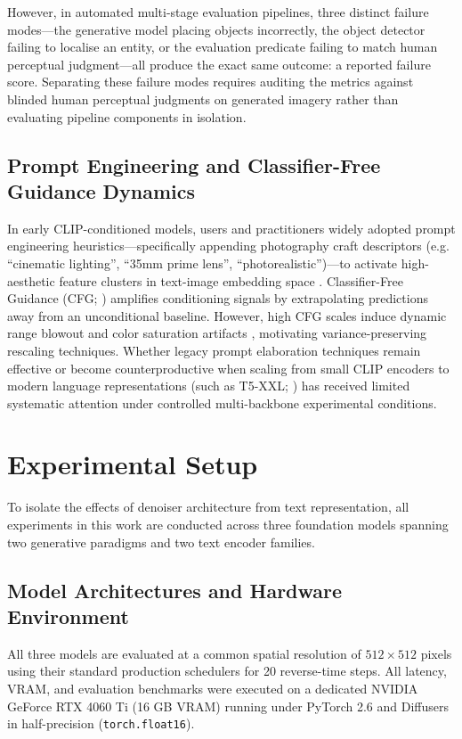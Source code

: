 \documentclass[10pt,twocolumn,letterpaper]{article}
\begin{document}
However, in automated multi-stage evaluation pipelines, three distinct failure modes---the generative model placing objects incorrectly, the object detector failing to localise an entity, or the evaluation predicate failing to match human perceptual judgment---all produce the exact same outcome: a reported failure score. Separating these failure modes requires auditing the metrics against blinded human perceptual judgments on generated imagery rather than evaluating pipeline components in isolation.

\subsection{Prompt Engineering and Classifier-Free Guidance Dynamics}
In early CLIP-conditioned models, users and practitioners widely adopted prompt engineering heuristics---specifically appending photography craft descriptors (e.g. ``cinematic lighting'', ``35mm prime lens'', ``photorealistic'')---to activate high-aesthetic feature clusters in text-image embedding space \citep{oppenlaender2023taxonomy}. Classifier-Free Guidance (CFG; \citealp{ho2022classifier}) amplifies conditioning signals by extrapolating predictions away from an unconditional baseline. However, high CFG scales induce dynamic range blowout and color saturation artifacts \citep{lin2023common}, motivating variance-preserving rescaling techniques. Whether legacy prompt elaboration techniques remain effective or become counterproductive when scaling from small CLIP encoders to modern language representations (such as T5-XXL; \citealp{raffel2020exploring}) has received limited systematic attention under controlled multi-backbone experimental conditions.

\section{Experimental Setup}

To isolate the effects of denoiser architecture from text representation, all experiments in this work are conducted across three foundation models spanning two generative paradigms and two text encoder families.

\subsection{Model Architectures and Hardware Environment}
All three models are evaluated at a common spatial resolution of $512\times 512$ pixels using their standard production schedulers for 20 reverse-time steps. All latency, VRAM, and evaluation benchmarks were executed on a dedicated NVIDIA GeForce RTX 4060 Ti (16 GB VRAM) running under PyTorch 2.6 and Diffusers in half-precision (\texttt{torch.float16}).
\end{document}
